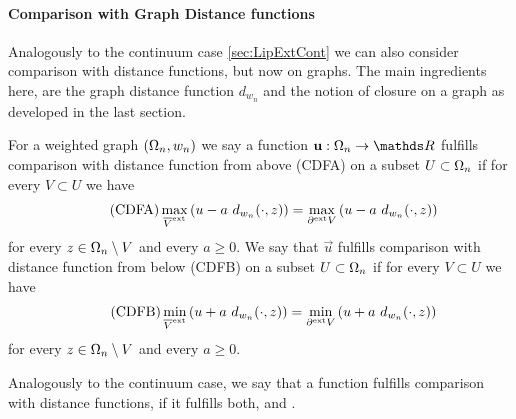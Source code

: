 \paragraph{Comparison with Graph Distance functions}
%
Analogously to the continuum case \cref{sec:LipExtCont} we can also consider comparison with distance functions, but now on graphs. The main ingredients here, are the graph distance function $d_{w_n}$ and the notion of closure on a graph as developed in the last section.
%
%
\begin{definition}{}{}
For a weighted graph $(\Omega_n,w_n)$ we say a function $\vec u:\domain_n\to\R$ fulfills comparison with distance function from above (CDFA) on a subset $U\subset \Omega_n$ if for every $V\subset U$ we have
%
\begin{align}\label{eq:CDFA}\tag{CDFA}
\max_{\overline{V}^{\text{ext}}} \left(u - a\ d_{w_n}(\cdot, z)\right)=
\max_{\partial^{\text{ext}} V} \left(u - a\ d_{w_n}(\cdot, z)\right)
\end{align}
%
for every $z\in \Omega_n\setminus V$ and every $a\geq 0$. We say that $\vec u$ fulfills comparison with distance function from below (CDFB) on a subset $U\subset \Omega_n$ if for every $V\subset U$ we have
%
\begin{align}\label{eq:CDFB}\tag{CDFB}
\min_{\overline{V}^{\text{ext}}} \left(u + a\ d_{w_n}(\cdot, z)\right)=
\min_{\partial^{\text{ext}} V} \left(u + a\ d_{w_n}(\cdot, z)\right)
\end{align}
%
for every $z\in \Omega_n\setminus V$ and every $a\geq 0$.
\end{definition}
%
%
\noindent%
Analogously to the continuum case, we say that a function fulfills comparison with distance functions, if it fulfills both,  and . 
%
%
%
